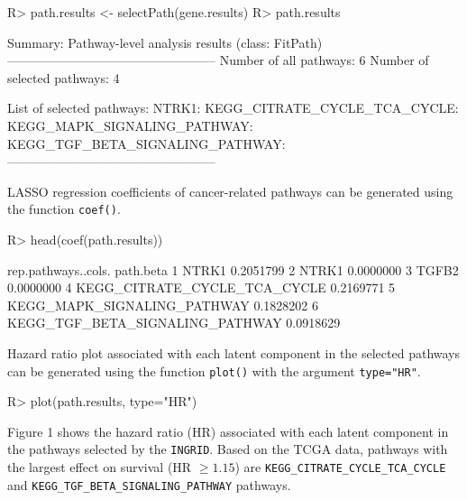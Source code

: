 \documentclass[11pt]{article}
\begin{document}
\begin{Schunk}
\begin{Sinput}
R> path.results <- selectPath(gene.results)
R> path.results
\end{Sinput}
\begin{Soutput}
Summary: Pathway-level analysis results (class: FitPath)
--------------------------------------------------
Number of all pathways: 6
Number of selected pathways: 4

List of selected pathways:
	NTRK1:
	KEGG_CITRATE_CYCLE_TCA_CYCLE:
	KEGG_MAPK_SIGNALING_PATHWAY:
	KEGG_TGF_BETA_SIGNALING_PATHWAY:
--------------------------------------------------
\end{Soutput}
\end{Schunk}

LASSO regression coefficients of cancer-related pathways can be generated using the function \texttt{coef()}.

\begin{Schunk}
\begin{Sinput}
R> head(coef(path.results))
\end{Sinput}
\begin{Soutput}
              rep.pathways..cols. path.beta
1                           NTRK1 0.2051799
2                           NTRK1 0.0000000
3                           TGFB2 0.0000000
4    KEGG_CITRATE_CYCLE_TCA_CYCLE 0.2169771
5     KEGG_MAPK_SIGNALING_PATHWAY 0.1828202
6 KEGG_TGF_BETA_SIGNALING_PATHWAY 0.0918629
\end{Soutput}
\end{Schunk}

Hazard ratio plot associated with each latent component in the selected pathways can be generated using the function \texttt{plot()} with the argument \texttt{type="{}HR"{}}.

\begin{Schunk}
\begin{Sinput}
R> plot(path.results, type="HR")
\end{Sinput}
\end{Schunk}

Figure 1 shows the hazard ratio (HR) associated with each latent component in the pathways selected by the \texttt{INGRID}.
Based on the TCGA data, pathways with the largest effect on survival (HR $\geq 1.15$) are \texttt{KEGG\_CITRATE\_CYCLE\_TCA\_CYCLE} and \texttt{KEGG\_TGF\_BETA\_SIGNALING\_PATHWAY} pathways.
\end{document}
